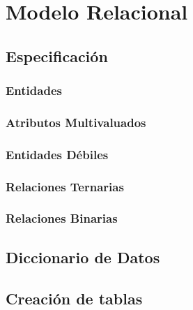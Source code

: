 \section{Modelo Relacional}


\subsection{Especificación}
\subsubsection{Entidades}
\subsubsection{Atributos Multivaluados}
\subsubsection{Entidades Débiles}
\subsubsection{Relaciones Ternarias}
\subsubsection{Relaciones Binarias}


\subsection{Diccionario de Datos}


\subsection{Creación de tablas}